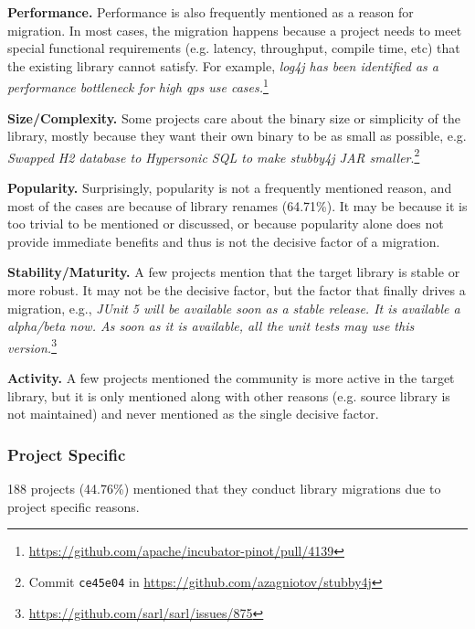 \documentclass[sigconf, screen]{acmart}
\begin{document}
\textbf{Performance.}
Performance is also frequently mentioned as a reason for migration.
In most cases, the migration happens because a project needs to meet special functional requirements (e.g. latency, throughput, compile time, etc) that the existing library cannot satisfy.
For example, \textit{log4j has been identified as a
performance bottleneck for high qps use cases.}\footnote{\url{https://github.com/apache/incubator-pinot/pull/4139}}

\textbf{Size/Complexity.} 
Some projects care about the binary size or simplicity of the library, mostly because they want their own binary to be as small as possible, e.g.
\textit{ Swapped H2 database to Hypersonic SQL to make stubby4j JAR smaller}.\footnote{Commit \texttt{ce45e04} in \url{https://github.com/azagniotov/stubby4j}}

\textbf{Popularity.} 
Surprisingly, popularity is not a frequently mentioned reason, and most of the cases are because of library renames (64.71\%). It may be because it is too trivial to be mentioned or discussed, or because popularity alone does not provide immediate benefits and thus is not the decisive factor of a migration.

\textbf{Stability/Maturity.} 
A few projects mention that the target library is stable or more robust.
It may not be the decisive factor, but the factor that finally drives a migration, e.g., \textit{JUnit 5 will be available soon as a stable release. 
It is available a alpha/beta now.
As soon as it is available, all the unit tests may use this version.}\footnote{\url{https://github.com/sarl/sarl/issues/875}}

\textbf{Activity.}
A few projects mentioned the community is more active in the target library, but it is only mentioned along with other reasons (e.g. source library is not maintained) and never mentioned as the single decisive factor.

\subsubsection{Project Specific}
188 projects (44.76\%) mentioned that they conduct library migrations due to project specific reasons.
\end{document}

